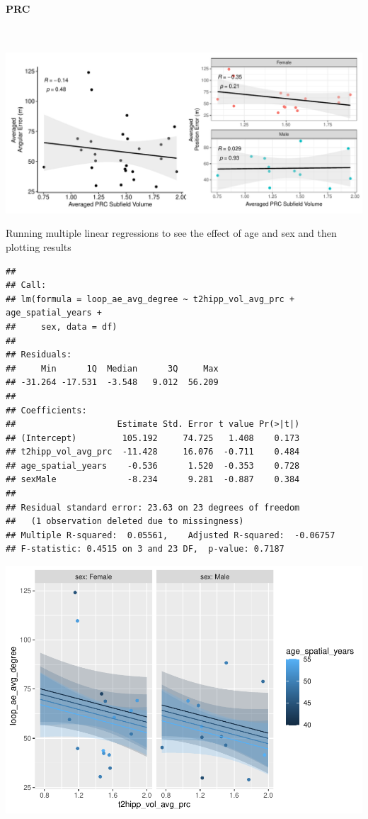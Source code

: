 \documentclass[
]{article}
\begin{document}
\vspace{1cm}

\paragraph{PRC}

~ \vspace{1cm}

\includegraphics{hippocampal_subfield_files/figure-latex/unnamed-chunk-5-1.pdf}

\vspace{1cm}

Running multiple linear regressions to see the effect of age and sex and
then plotting results

\begin{verbatim}
## 
## Call:
## lm(formula = loop_ae_avg_degree ~ t2hipp_vol_avg_prc + age_spatial_years + 
##     sex, data = df)
## 
## Residuals:
##     Min      1Q  Median      3Q     Max 
## -31.264 -17.531  -3.548   9.012  56.209 
## 
## Coefficients:
##                    Estimate Std. Error t value Pr(>|t|)
## (Intercept)         105.192     74.725   1.408    0.173
## t2hipp_vol_avg_prc  -11.428     16.076  -0.711    0.484
## age_spatial_years    -0.536      1.520  -0.353    0.728
## sexMale              -8.234      9.281  -0.887    0.384
## 
## Residual standard error: 23.63 on 23 degrees of freedom
##   (1 observation deleted due to missingness)
## Multiple R-squared:  0.05561,    Adjusted R-squared:  -0.06757 
## F-statistic: 0.4515 on 3 and 23 DF,  p-value: 0.7187
\end{verbatim}

\includegraphics{hippocampal_subfield_files/figure-latex/Avg PRC + avg angular error MLR-1.pdf}
\vspace{1cm}
\end{document}
